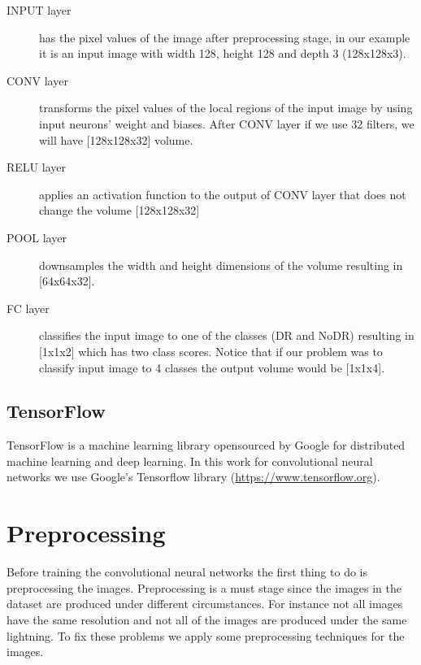 \begin{description}
    \item[INPUT layer] has the pixel values of the image after preprocessing stage, in our example it is an input image with width 128, height 128 and depth 3 (128x128x3).
    \item[CONV layer] transforms the pixel values of the local regions of the input image by using input neurons' weight and biases. After CONV layer if we use 32 filters, we will have [128x128x32] volume.
    \item[RELU layer] applies an activation function to the output of CONV layer that does not change the volume [128x128x32]
    \item[POOL layer] downsamples the width and height dimensions of the volume resulting in [64x64x32].
    \item[FC layer] classifies the input image to one of the classes (DR and NoDR) resulting in [1x1x2] which has two class scores. Notice that if our problem was to classify input image to 4 classes the output volume would be [1x1x4].
\end{description}


\subsection{TensorFlow}
TensorFlow is a machine learning library opensourced by Google for distributed machine learning and deep learning. In this work for convolutional neural networks we use Google's Tensorflow library (\url{https://www.tensorflow.org}).


\section{Preprocessing}
Before training the convolutional neural networks the first thing to do is preprocessing the images. Preprocessing is a must stage since the images in the dataset are produced under different circumstances. For instance not all images have the same resolution and not all of the images are produced under the same lightning. To fix these problems we apply some preprocessing techniques for the images. 

